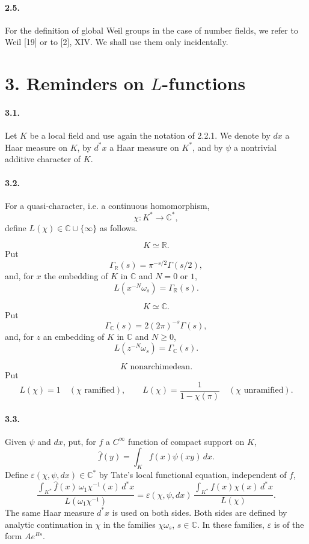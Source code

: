 \documentclass[10pt]{article}
\newcommand{\C}{\mathbb C}
\providecommand{\R}{\mathbb R}
\begin{document}
\paragraph{2.5.} For the definition of global Weil groups in the case of number fields, we refer to Weil [19] or to [2], XIV. We shall use them only incidentally.

\section*{3. Reminders on \(L\)-functions}

\paragraph{3.1.} Let \(K\) be a local field and use again the notation of 2.2.1. We denote by \(dx\) a Haar measure on \(K\), by \(d^*x\) a Haar measure on \(K^*\), and by \(\psi\) a nontrivial additive character of \(K\).

\paragraph{3.2.} For a quasi-character, i.e. a continuous homomorphism,
\[
\chi:K^*\longrightarrow\C^*,
\]
define \(L(\chi)\in\C\cup\{\infty\}\) as follows.

\[
\tag{3.2.1}
K\simeq\R.
\]
Put
\[
\Gamma_\R(s)=\pi^{-s/2}\Gamma(s/2),
\]
and, for \(x\) the embedding of \(K\) in \(\C\) and \(N=0\) or \(1\),
\[
L(x^{-N}\omega_s)=\Gamma_\R(s).
\]

\[
\tag{3.2.2}
K\simeq\C.
\]
Put
\[
\Gamma_\C(s)=2(2\pi)^{-s}\Gamma(s),
\]
and, for \(z\) an embedding of \(K\) in \(\C\) and \(N\ge0\),
\[
L(z^{-N}\omega_s)=\Gamma_\C(s).
\]

\[
\tag{3.2.3}
K\text{ nonarchimedean.}
\]
Put
\[
L(\chi)=1\quad(\chi\text{ ramified}),
\qquad
L(\chi)=\frac1{1-\chi(\pi)}\quad(\chi\text{ unramified}).
\]

\paragraph{3.3.} Given \(\psi\) and \(dx\), put, for \(f\) a \(C^\infty\) function of compact support on \(K\),
\[
\widehat f(y)=\int_K f(x)\psi(xy)\,dx.
\]
Define \(\varepsilon(\chi,\psi,dx)\in\C^*\) by Tate's local functional equation, independent of \(f\),
\[
\tag{3.3.1}
\frac{\displaystyle\int_{K^*}\widehat f(x)\,\omega_1\chi^{-1}(x)\,d^*x}
     {L(\omega_1\chi^{-1})}
=
\varepsilon(\chi,\psi,dx)\,
\frac{\displaystyle\int_{K^*}f(x)\chi(x)\,d^*x}
     {L(\chi)}.
\]
The same Haar measure \(d^*x\) is used on both sides. Both sides are defined by analytic continuation in \(\chi\) in the families \(\chi\omega_s\), \(s\in\C\). In these families, \(\varepsilon\) is of the form \(Ae^{Bs}\).
\end{document}
